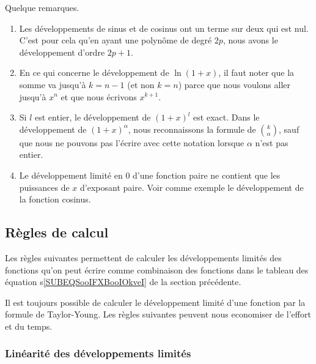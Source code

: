 \begin{remark}
  Quelque remarques.
  \begin{enumerate}
  \item
    Les développements de sinus et de cosinus ont un terme sur deux qui est nul. C'est pour cela qu'en ayant une polynôme de degré \( 2p\), nous avons le développement d'ordre \( 2p+1\).
  \item
    En ce qui concerne le développement de \( \ln(1+x)\), il faut noter que la somme va jusqu'à \( k=n-1\) (et non \( k=n\)) parce que nous voulons aller jusqu'à \( x^n\) et que nous écrivons \( x^{k+1}\).
  \item
    Si \( l\) est entier, le développement de \( (1+x)^l\) est exact. Dans le développement de \( (1+x)^{\alpha}\), nous reconnaissons la formule de \( \binom{ k }{\alpha }\), sauf que nous ne pouvons pas l'écrire avec cette notation lorsque \( \alpha\) n'est pas entier.
  \item Le développement limité en $0$ d'une fonction paire ne contient que les puissances de $x$ d'exposant paire. Voir comme exemple le développement de la fonction cosinus.
  \end{enumerate}
\end{remark}

\subsection{Règles de calcul}

Les règles suivantes permettent de calculer les développements limités des fonctions qu'on peut écrire comme combinaison des fonctions dans le tableau des équation s\eqref{SUBEQSooIFXBooIOkveI} de la section précédente. 
\begin{remark}
  Il est toujours possible de calculer le développement limité d'une fonction par la formule de Taylor-Young. Les règles suivantes peuvent nous economiser de l'effort et du temps. 
\end{remark}

\subsubsection{Linéarité des développements limités}

